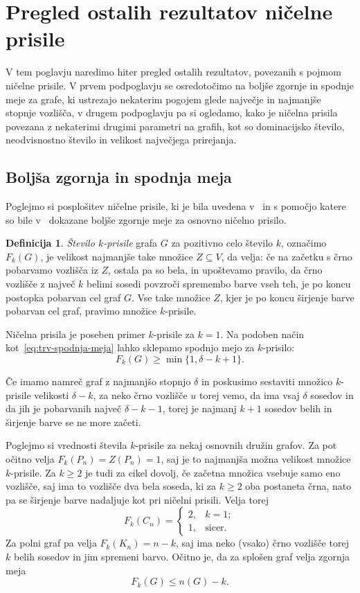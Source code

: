\documentclass[12pt,a4paper,twoside]{article}
\theoremstyle{definition} %
\newtheorem{definicija}{Definicija}[section]
\theoremstyle{plain} %
\numberwithin{equation}{section}  %
\begin{document}
\section{Pregled ostalih rezultatov ničelne prisile}
V tem poglavju naredimo hiter pregled ostalih rezultatov, povezanih s pojmom ničelne prisile. V prvem podpoglavju se osredotočimo na boljše zgornje in spodnje meje za grafe, ki ustrezajo nekaterim pogojem glede največje in najmanjše stopnje vozlišča, v drugem podpoglavju pa si ogledamo, kako je ničelna prisila povezana z nekaterimi drugimi parametri na grafih, kot so dominacijsko število, neodvisnostno število in velikost največjega prirejanja.

\subsection{Boljša zgornja in spodnja meja}
Poglejmo si posplošitev ničelne prisile, ki je bila uvedena v~\cite{amos2015kforcing} in s pomočjo katere so bile v~\cite{amos2015kforcing, gentner2018bounds} dokazane boljše zgornje meje za osnovno ničelno prisilo.
\begin{definicija}
    \label{def:k-prisila}
    \emph{Število $k$-prisile} grafa $G$ za pozitivno celo število $k$, označimo $F_k(G)$, je velikost najmanjše take množice $Z \subseteq V$, da velja: če na začetku s črno pobarvamo vozlišča iz $Z$, ostala pa so bela, in upoštevamo pravilo, da črno vozlišče z največ $k$ belimi sosedi povzroči spremembo barve vseh teh, je po koncu postopka pobarvan cel graf $G$. Vse take množice $Z$, kjer je po koncu širjenje barve pobarvan cel graf, pravimo množice $k$-prisile.
\end{definicija}

Ničelna prisila je poseben primer $k$-prisile za $k=1$. Na podoben način kot~\eqref{eq:trv-spodnja-meja} lahko sklepamo spodnjo mejo za $k$-prisilo:
\begin{equation}
    F_k(G) \geq \min\{1, \delta - k + 1\} .
    \label{eq:kprisila-trv-spodnja-meja}
\end{equation}

Če imamo namreč graf z najmanjšo stopnjo $\delta$ in poskusimo sestaviti množico $k$-prisile velikosti $\delta - k$, za neko črno vozlišče $u$ torej vemo, da ima vsaj $\delta$ sosedov in da jih je pobarvanih največ $\delta - k - 1$, torej je najmanj $k + 1$ sosedov belih in širjenje barve se ne more začeti.

Poglejmo si vrednosti števila $k$-prisile za nekaj osnovnih družin grafov. Za pot očitno velja $F_k(P_n) = Z(P_n) = 1$, saj je to najmanjša možna velikost množice $k$-prisile. Za $k \geq 2$ je tudi za cikel dovolj, če začetna množica vsebuje samo eno vozlišče, saj ima to vozlišče dva bela soseda, ki za $k \geq 2$ oba postaneta črna, nato pa se širjenje barve nadaljuje kot pri ničelni prisili. Velja torej
\[ F_k(C_n) =
\begin{cases}
    2, & k = 1; \\
    1, & \text{sicer.}
\end{cases}
\]
Za polni graf pa velja $F_k(K_n) = n-k$, saj ima neko (vsako) črno vozlišče torej $k$ belih sosedov in jim spremeni barvo. Očitno je, da za splošen graf velja zgornja meja
\[ F_k(G) \leq n(G) - k .\]
\end{document}
